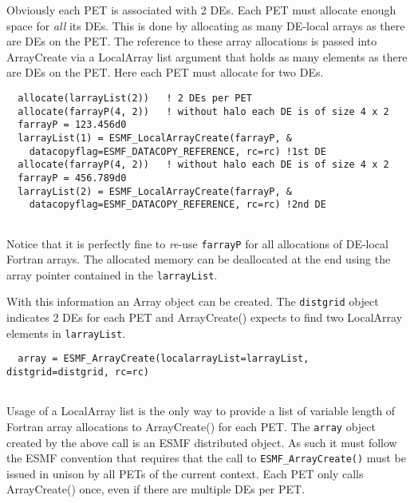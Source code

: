    Obviously each PET is associated with 2 DEs. Each PET must allocate enough
   space for {\em all} its DEs. This is done by allocating 
   as many DE-local arrays as there are DEs on the PET. The reference to these
   array allocations is passed into ArrayCreate via a LocalArray list argument
   that holds as many elements as there are DEs on the PET. Here each PET must
   allocate for two DEs.
   

 \begin{verbatim}
  allocate(larrayList(2))   ! 2 DEs per PET
  allocate(farrayP(4, 2))   ! without halo each DE is of size 4 x 2 
  farrayP = 123.456d0
  larrayList(1) = ESMF_LocalArrayCreate(farrayP, &
    datacopyflag=ESMF_DATACOPY_REFERENCE, rc=rc) !1st DE
  allocate(farrayP(4, 2))   ! without halo each DE is of size 4 x 2 
  farrayP = 456.789d0
  larrayList(2) = ESMF_LocalArrayCreate(farrayP, &
    datacopyflag=ESMF_DATACOPY_REFERENCE, rc=rc) !2nd DE  
 
\end{verbatim}
 

   Notice that it is perfectly fine to {\em re}-use {\tt farrayP} for all
   allocations of DE-local Fortran arrays. The allocated memory can be 
   deallocated at the end using the array pointer contained in the 
   {\tt larrayList}.
  
   With this information an Array object can be created. The {\tt distgrid}
   object indicates 2 DEs for each PET and ArrayCreate() expects to find two
   LocalArray elements in {\tt larrayList}. 

 \begin{verbatim}
  array = ESMF_ArrayCreate(localarrayList=larrayList, distgrid=distgrid, rc=rc)
 
\end{verbatim}
 

   Usage of a LocalArray list is the only way to provide a list of variable 
   length of Fortran array allocations to ArrayCreate() for each PET. The 
   {\tt array} object created by the above call is an ESMF distributed 
   object. As such it must follow the ESMF convention that requires that 
   the call to {\tt ESMF\_ArrayCreate()} must be issued in unison by all 
   PETs of the current context. Each PET only calls ArrayCreate() once, even if
   there are multiple DEs per PET.
  
